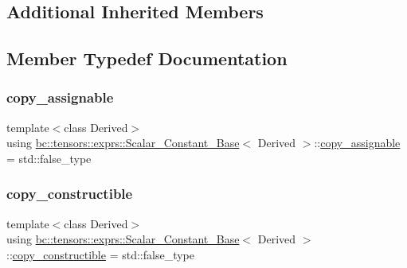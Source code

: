 \subsection*{Additional Inherited Members}


\subsection{Member Typedef Documentation}
\mbox{\label{structbc_1_1tensors_1_1exprs_1_1Scalar__Constant__Base_a5d617c0b0c3be101e65f4a7096637047}} 
\subsubsection{\texorpdfstring{copy\+\_\+assignable}{copy\_assignable}}
{\footnotesize\ttfamily template$<$class Derived$>$ \\
using \hyperlink{structbc_1_1tensors_1_1exprs_1_1Scalar__Constant__Base}{bc\+::tensors\+::exprs\+::\+Scalar\+\_\+\+Constant\+\_\+\+Base}$<$ Derived $>$\+::\hyperlink{structbc_1_1tensors_1_1exprs_1_1Scalar__Constant__Base_a5d617c0b0c3be101e65f4a7096637047}{copy\+\_\+assignable} =  std\+::false\+\_\+type}

\mbox{\label{structbc_1_1tensors_1_1exprs_1_1Scalar__Constant__Base_a1ee2abab850baa05c97c6a7144b5d9b2}} 
\subsubsection{\texorpdfstring{copy\+\_\+constructible}{copy\_constructible}}
{\footnotesize\ttfamily template$<$class Derived$>$ \\
using \hyperlink{structbc_1_1tensors_1_1exprs_1_1Scalar__Constant__Base}{bc\+::tensors\+::exprs\+::\+Scalar\+\_\+\+Constant\+\_\+\+Base}$<$ Derived $>$\+::\hyperlink{structbc_1_1tensors_1_1exprs_1_1Scalar__Constant__Base_a1ee2abab850baa05c97c6a7144b5d9b2}{copy\+\_\+constructible} =  std\+::false\+\_\+type}

